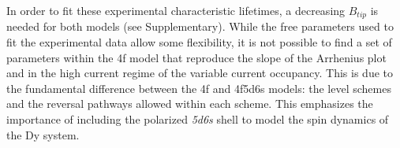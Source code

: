 \documentclass[
reprint,amsmath,amssymb,aps]{revtex4-2}
\begin{document}


In order to fit these experimental characteristic lifetimes, a decreasing $B_{tip}$ is needed for both models (see Supplementary). While the free parameters used to fit the experimental data allow some flexibility, it is not possible to find a set of parameters within the 4f model that reproduce the slope of the Arrhenius plot and in the high current regime of the variable current occupancy. This is due to the fundamental difference between the 4f and 4f5d6s models: the level schemes and the reversal pathways allowed within each scheme. This emphasizes the importance of including the polarized \textit{5d6s} shell to model the spin dynamics of the Dy system.
\end{document}

